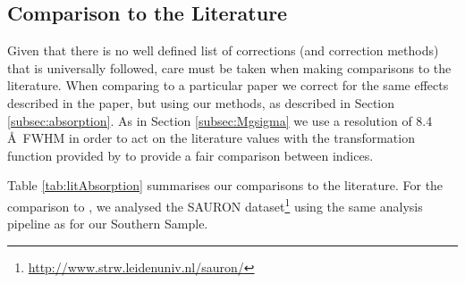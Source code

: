 \documentclass[a4paper,fleqn,usenatbib]{mnras}
\begin{document}
	\subsection{Comparison to the Literature}
		\label{subsec:Lit}
		Given that there is no well defined list of corrections (and correction methods) that is universally followed, care must be taken when making comparisons to the literature. When comparing to a particular paper we correct for the same effects described in the paper, but using our methods, as described in Section \ref{subsec:absorption}. As in Section \ref{subsec:Mgsigma} we use a resolution of 8.4\,\AA\ FWHM in order to act on the literature values with the transformation function provided by \citet{Vazdekis2010} to provide a fair comparison between indices.

		Table \ref{tab:litAbsorption} summarises our comparisons to the literature. For the comparison to \citet{Vazdekis2010}, we analysed the SAURON dataset\footnote{\url{http://www.strw.leidenuniv.nl/sauron/}} \citep{Emsellem2004} using the same analysis pipeline as for our Southern Sample. 
\end{document}
